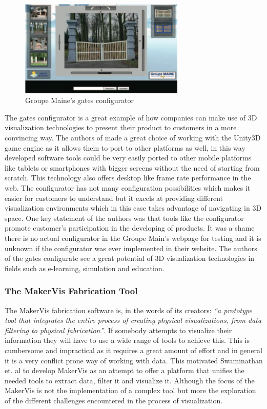 \documentclass[../medieninformatik-arbeit.tex]{subfiles}
\begin{document}
\begin{figure}[hb]
\begin{center}
  \includegraphics[width=0.7\textwidth]{RelatedWork/img/gates-config}
  \caption{Groupe Maine's gates configurator\cite{rolland2012commerce} }
\label{fig:gates-config}
\end{center}
\end{figure}

The gates configurator is a great example of how companies can make use of 3D visualization technologies to present their product to customers in a more convincing way. The authors of made a great choice of working with the Unity3D game engine as it allows them to port to other platforms as well, in this way developed software tools could be very easily ported to other mobile platforms like tablets or smartphones with bigger screens without the need of starting from scratch. This technology also offers desktop like frame rate performance in the web. The configurator has not many configuration possibilities which makes it easier for customers to understand but it excels at providing different visualization environments which in this case takes advantage of navigating in 3D space. One key statement of the authors was that tools like the configurator promote customer's participation in the developing of products. It was a shame there is no actual configurator in the Groupe Main's webpage for testing and it is unknown if the configurator was ever implemented in their website. The authors of the gates configurate see a great potential of 3D visualization technologies in fields such as e-learning, simulation and education.

\subsubsection{The MakerVis Fabrication Tool}
The MakerVis fabrication software is, in the words of its creators: \textit{``a prototype tool that integrates the entire process of creating physical visualizations, from data filtering to physical fabrication''}\cite{swaminathan2014supporting}. If somebody attempts to visualize their information they will have to use a wide range of tools to achieve this. This is cumbersome and impractical as it requires a great amount of effort and in general it is a very conflict prone way of working with data. This motivated Swaminathan et. al to develop MakerVis as an attempt to offer a platform that unifies the needed tools to extract data, filter it and visualize it. Although the focus of the MakerVis is not the implementation of a complex tool but more the exploration of the different challenges encountered in the process of visualization.
\end{document}
